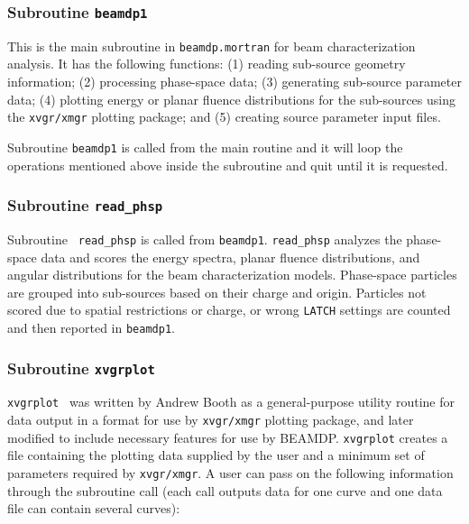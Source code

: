 \documentclass[12pt,twoside]{article}
\begin{document}
\subsubsection{Subroutine {\tt beamdp1}} This is the main subroutine in
{\tt beamdp.mortran} for beam characterization analysis. It has the
following functions: (1) reading sub-source geometry information; (2)
processing phase-space data; (3) generating sub-source parameter data; (4)
plotting energy or planar fluence distributions for the sub-sources using
the {\tt xvgr/xmgr} plotting package; and (5) creating source parameter
input files.

Subroutine {\tt beamdp1} is called from the main routine and it will loop
the operations mentioned above inside the subroutine and quit until it is
requested.  \subsubsection{Subroutine {\tt read\_phsp}} Subroutine {\tt
read\_phsp} is called from {\tt beamdp1}. {\tt read\_phsp} analyzes the
phase-space data and scores the energy spectra, planar fluence
distributions, and angular distributions for the beam characterization
models. Phase-space particles are grouped into sub-sources based on their
charge and origin. Particles not scored due to spatial restrictions or
charge, or wrong {\tt LATCH} settings are counted  and then reported in
{\tt beamdp1}.  \subsubsection{Subroutine {\tt xvgrplot}} {\tt xvgrplot }
was written by Andrew Booth as a general-purpose utility routine for data
output in a format for use by {\tt xvgr/xmgr} plotting package, and later
modified to include necessary features for use by BEAMDP. {\tt xvgrplot}
creates a file containing the plotting data supplied by the user and a
minimum set of parameters required by {\tt xvgr/xmgr}. A user can pass on
the following information through the subroutine call (each call outputs
data for one curve and one data file can contain several curves):
\end{document}
